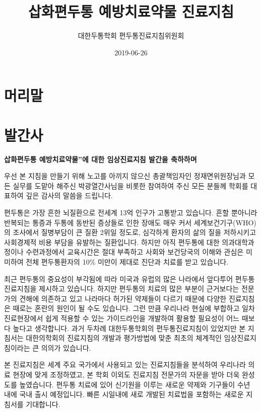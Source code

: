 \documentclass[]{book}
\title{삽화편두통 예방치료약물 진료지침}
\author{대한두통학회 편두통진료지침위원회}
\date{2019-06-26}
\begin{document}
\maketitle

{
\setcounter{tocdepth}{1}
\tableofcontents
}
\frontmatter

\hypertarget{section}{%
\chapter*{머리말}\label{section}}

\hypertarget{section-1}{%
\chapter*{발간사}\label{section-1}}

\textbf{삽화편두통 예방치료약물''에 대한 임상진료지침 발간을 축하하며}

우선 본 지침을 만들기 위해 노고를 아끼지 않으신 총괄책임자인 정재면위원장님과 모든 실무를 도맡아 해주신 박광열간사님을 비롯한 참여하여 주신 모든 분들께 학회를 대표하여 깊은 감사의 말씀을 드립니다.

편두통은 가장 흔한 뇌질환으로 전세계 13억 인구가 고통받고 있습니다. 흔할 뿐아니라 반복되는 통증과 두통에 동반된 증상들로 인한 장애도 매우 커서 세계보건기구(WHO)의 조사에서 질병부담이 큰 질환 2위일 정도로, 심각하게 환자의 삶의 질을 저하시키고 사회경제적 비용 부담을 유발하는 질환입니다. 하지만 아직 편두통에 대한 의과대학과정이나 수련과정에서 교육시간은 절대 부족하고 사회와 보건당국의 이해와 관심은 미미하여 전체 편두통환자의 10\% 미만이 제대로 진단과 치료를 받고 있습니다.

최근 편두통의 중요성이 부각됨에 따라 미국과 유럽의 많은 나라에서 앞다투어 편두통 진료지침을 제시하고 있습니다. 하지만 편두통의 치료의 많은 부분이 근거보다는 전문가의 견해에 의존하고 있고 나라마다 허가된 약제들이 다르기 때문에 다양한 진료지침은 때로는 혼란의 원인이 될 수도 있습니다. 그런 만큼 우리나라 현실에 부합하고 일차 진료현장에서 쉽게 적용할 수 있는 가이드라인을 개발하여 활용할 필요성이 어느 때보다 높다고 생각합니다. 과거 두차례 대한두통학회의 편두통진료지침이 있었지만 본 지침서는 대한의학회의 진료지침의 개발과 평가방법에 맞춘 최초의 체계적인 임상진료지침이라는 큰 의의가 있습니다.

본 진료지침은 세계 주요 국가에서 사용되고 있는 진료지침들을 분석하여 우리나라 의료 현장에 맞게 조정하였고, 본 학회 이외도 진료지침 전문가의 자문을 받아 더욱 완성도를 높였습니다. 편두통 치료에 있어 신기원을 이루는 새로운 약제와 기구들이 수년 내에 국내 출시 예정입니다. 빠른 시일내에 새로 개발된 치료법을 포함하는 새로운 지침서를 기대합니다.
\end{document}

